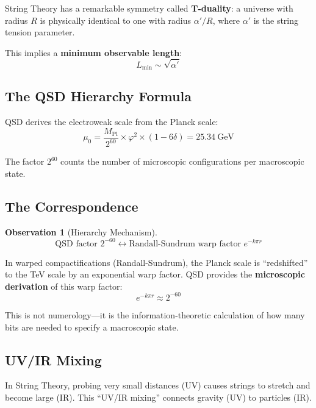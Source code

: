 \documentclass[11pt,a4paper]{article}
\theoremstyle{definition}
\newtheorem{observation}[theorem]{Observation}
\newcommand{\dgeo}{\delta}
\newcommand{\murad}{\mu_0}
\newcommand{\Mpl}{M_{\text{Pl}}}
\newcommand{\ap}{\alpha'}
\begin{document}
String Theory has a remarkable symmetry called \textbf{T-duality}: a universe with radius $R$ is physically identical to one with radius $\ap/R$, where $\ap$ is the string tension parameter.

This implies a \textbf{minimum observable length}:
\begin{equation}
L_{\text{min}} \sim \sqrt{\ap}
\end{equation}

\subsection{The QSD Hierarchy Formula}

QSD derives the electroweak scale from the Planck scale:
\begin{equation}
\murad = \frac{\Mpl}{2^{60}} \times \varphi^2 \times (1 - 6\dgeo) = 25.34~\text{GeV}
\end{equation}

The factor $2^{60}$ counts the number of microscopic configurations per macroscopic state.

\subsection{The Correspondence}

\begin{observation}[Hierarchy Mechanism]
\begin{equation}
\text{QSD factor } 2^{-60} \longleftrightarrow \text{Randall-Sundrum warp factor } e^{-k\pi r}
\end{equation}
\end{observation}

In warped compactifications (Randall-Sundrum), the Planck scale is ``redshifted'' to the TeV scale by an exponential warp factor. QSD provides the \textbf{microscopic derivation} of this warp factor:
\begin{equation}
e^{-k\pi r} \approx 2^{-60}
\end{equation}

This is not numerology---it is the information-theoretic calculation of how many bits are needed to specify a macroscopic state.

\subsection{UV/IR Mixing}

In String Theory, probing very small distances (UV) causes strings to stretch and become large (IR). This ``UV/IR mixing'' connects gravity (UV) to particles (IR).
\end{document}

